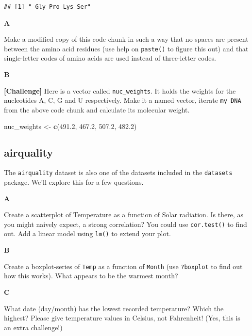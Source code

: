 \documentclass[]{book}
\newenvironment{Shaded}{\begin{snugshade}}{\end{snugshade}}
\newcommand{\FloatTok}[1]{\textcolor[rgb]{0.00,0.00,0.81}{#1}}
\newcommand{\KeywordTok}[1]{\textcolor[rgb]{0.13,0.29,0.53}{\textbf{#1}}}
\newcommand{\NormalTok}[1]{#1}
\newcommand{\StringTok}[1]{\textcolor[rgb]{0.31,0.60,0.02}{#1}}
\begin{document}
\begin{verbatim}
## [1] " Gly Pro Lys Ser"
\end{verbatim}

\textbf{A}

Make a modified copy of this code chunk in such a way that no spaces are present between the amino acid residues (use help on \texttt{paste()} to figure this out) and that single-letter codes of amino acids are used instead of three-letter codes.

\textbf{B}

\textbf{{[}Challenge{]}} Here is a vector called \texttt{nuc\_weights}. It holds the weights for the nucleotides A, C, G and U respectively. Make it a named vector, iterate \texttt{my\_DNA} from the above code chunk and calculate its molecular weight.

\begin{Shaded}
\begin{Highlighting}[]
\NormalTok{nuc_weights <-}\StringTok{ }\KeywordTok{c}\NormalTok{(}\FloatTok{491.2}\NormalTok{, }\FloatTok{467.2}\NormalTok{, }\FloatTok{507.2}\NormalTok{, }\FloatTok{482.2}\NormalTok{)}
\end{Highlighting}
\end{Shaded}

\hypertarget{airquality}{%
\subsection{airquality}\label{airquality}}

The \texttt{airquality} dataset is also one of the datasets included in the \texttt{datasets} package. We'll explore this for a few questions.

\textbf{A}

Create a scatterplot of Temperature as a function of Solar radiation. Is there, as you might naively expect, a strong correlation? You could use \texttt{cor.test()} to find out. Add a linear model using \texttt{lm()} to extend your plot.

\textbf{B}

Create a boxplot-series of \texttt{Temp} as a function of \texttt{Month} (use \texttt{?boxplot} to find out how this works). What appears to be the warmest month?

\textbf{C}

What date (day/month) has the lowest recorded temperature? Which the highest? Please give temperature values in Celsius, not Fahrenheit! (Yes, this is an extra challenge!)
\end{document}

